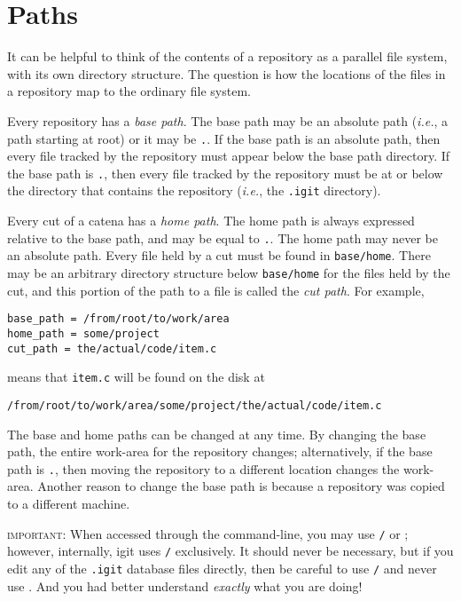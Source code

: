 \documentclass[10pt]{article}
\newcommand{\dotpath}{{\tt\textquotesingle.\textquotesingle}}
\begin{document}
\section{Paths}\label{section-paths}

It can be helpful to think of the contents of a repository as a
parallel file system, with its own directory structure. The question is
how the locations of the files in a repository map to the ordinary file
system.

Every repository has a {\it base path}. The base path may be an
absolute path ({\it i.e.}, a path starting at root) or it 
may be \dotpath. If the base path is an absolute path, then
every file tracked by the repository must appear below the base path
directory. If the base path is \dotpath, then every file tracked by the
repository must be at or below the directory that contains the repository
({\it i.e.}, the {\tt .igit} directory).

Every cut of a catena has a {\it home path}. The home path is
always expressed relative to the base path, and may be equal to
\dotpath. The home path may never be an absolute path. Every file held
by a cut must be found in {\tt base/home}. 
There may be an arbitrary directory structure below {\tt base/home}
for the files held by the cut, and this portion of the path to a file
is called the {\it cut path}. For example, 
\begin{verbatim}
base_path = /from/root/to/work/area
home_path = some/project
cut_path = the/actual/code/item.c
\end{verbatim}
means that {\tt item.c} will be found on the disk at
\begin{verbatim}
/from/root/to/work/area/some/project/the/actual/code/item.c
\end{verbatim} 

The base and home paths can be changed at any time. By
changing the base path, the entire work-area for the repository changes;
alternatively, if the base path is \dotpath, then moving the
repository to a different location changes the work-area. Another
reason to change the base path is because a repository was copied to a
different machine. 

{\textsc{\large important}}: When accessed through the command-line,
you may use {\tt\textquotesingle/\textquotesingle} or
{\tt{}\textquotesingle}; however,
internally, igit uses {\tt\textquotesingle/\textquotesingle} exclusively.
It should never be necessary, but if you edit any of the {\tt .igit}
database files directly, then be careful to use
{\tt\textquotesingle/\textquotesingle} and never use
{\tt{}\textquotesingle}. And you had
better understand {\it exactly} what you are doing!
\end{document}
